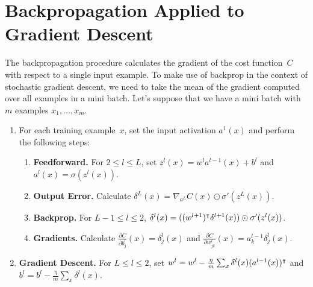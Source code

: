 \section{Backpropagation Applied to Gradient Descent}

The backpropagation procedure calculates the gradient of the cost
function~$C$ with respect to a single input example. To make use of
backprop in the context of stochastic gradient descent, we need to take
the mean of the gradient computed over all examples in a mini batch.
Let's suppose that we have a mini batch with $m$ examples
$x_1, \ldots, x_m$.
\begin{enumerate}
    \item For each training example~$x$, set the input activation
        $a^1 (x)$ and perform the following steps:
        \begin{enumerate}
            \item \textbf{Feedforward.} For $2 \leq l \leq L$, set
                $z^l (x) = w^l a^{l - 1} (x) + b^l$ and
                $a^l (x) = \sigma (z^l (x))$.
            \item \textbf{Output Error.} Calculate
                $\delta^L (x) = \nabla_{a^L} C(x) \odot \sigma' (z^L (x) )$.
            \item \textbf{Backprop.} For $L - 1 \leq l \leq 2$,
                $\delta^l (x) = ( (w^{l + 1})^{\intercal} \delta^{l + 1} (x) )
                                    \odot \sigma' (z^l (x))$.
            \item \textbf{Gradients.} Calculate
            $ \frac{\partial C}{\partial b_j^{l}} (x) = \delta_{j}^l (x)$
            and $\frac{\partial C}{\partial w_{j k}^l} (x)
                    = a_{k}^{l - 1} \delta_{j}^l (x)$.
        \end{enumerate}
    \item \textbf{Gradient Descent.} For $L \leq l \leq 2$, set
        $w^l = w^l - \frac{\eta}{m} \sum_{x} \delta^{l} (x) (a^{l - 1} (x))^{\intercal}$
        and
        $b^l = b^l - \frac{\eta}{m} \sum_{x} \delta^l (x)$.
\end{enumerate}
